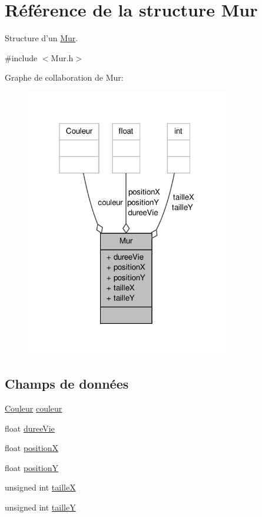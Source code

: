\hypertarget{structMur}{\section{Référence de la structure Mur}
\label{structMur}
}


Structure d'un \hyperlink{structMur}{Mur}.  




{\ttfamily \#include $<$Mur.\-h$>$}



Graphe de collaboration de Mur\-:\nopagebreak
\begin{figure}[H]
\begin{center}
\leavevmode
\includegraphics[width=253pt]{structMur__coll__graph}
\end{center}
\end{figure}
\subsection*{Champs de données}
\begin{DoxyCompactItemize}
\item 
\hyperlink{Couleur_8h_aa304d0ca681f782b1d7735da33037dd7}{Couleur} \hyperlink{structMur_adfb47de65971e21c8b3012cfcf7cab28}{couleur}
\item 
float \hyperlink{structMur_a7b0f44b48d4a8408e1adeb057ad201f8}{duree\-Vie}
\item 
float \hyperlink{structMur_affc832d25c091c05a2ab0340a38e8617}{position\-X}
\item 
float \hyperlink{structMur_a5cb3e3d2e2f71120f6746772a44a0980}{position\-Y}
\item 
unsigned int \hyperlink{structMur_a83d5a0639f49e58cfb805a91702d6701}{taille\-X}
\item 
unsigned int \hyperlink{structMur_ad0c6b841ae4069d6b4e6559d7e88cf47}{taille\-Y}
\end{DoxyCompactItemize}


